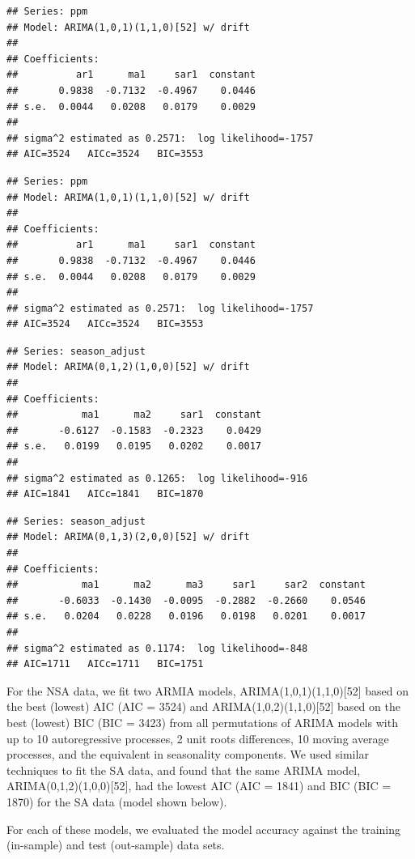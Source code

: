 \documentclass[AER]{AEA}
\begin{document}
\begin{verbatim}
## Series: ppm 
## Model: ARIMA(1,0,1)(1,1,0)[52] w/ drift 
## 
## Coefficients:
##          ar1      ma1     sar1  constant
##       0.9838  -0.7132  -0.4967    0.0446
## s.e.  0.0044   0.0208   0.0179    0.0029
## 
## sigma^2 estimated as 0.2571:  log likelihood=-1757
## AIC=3524   AICc=3524   BIC=3553
\end{verbatim}

\begin{verbatim}
## Series: ppm 
## Model: ARIMA(1,0,1)(1,1,0)[52] w/ drift 
## 
## Coefficients:
##          ar1      ma1     sar1  constant
##       0.9838  -0.7132  -0.4967    0.0446
## s.e.  0.0044   0.0208   0.0179    0.0029
## 
## sigma^2 estimated as 0.2571:  log likelihood=-1757
## AIC=3524   AICc=3524   BIC=3553
\end{verbatim}

\begin{verbatim}
## Series: season_adjust 
## Model: ARIMA(0,1,2)(1,0,0)[52] w/ drift 
## 
## Coefficients:
##           ma1      ma2     sar1  constant
##       -0.6127  -0.1583  -0.2323    0.0429
## s.e.   0.0199   0.0195   0.0202    0.0017
## 
## sigma^2 estimated as 0.1265:  log likelihood=-916
## AIC=1841   AICc=1841   BIC=1870
\end{verbatim}

\begin{verbatim}
## Series: season_adjust 
## Model: ARIMA(0,1,3)(2,0,0)[52] w/ drift 
## 
## Coefficients:
##           ma1      ma2      ma3     sar1     sar2  constant
##       -0.6033  -0.1430  -0.0095  -0.2882  -0.2660    0.0546
## s.e.   0.0204   0.0228   0.0196   0.0198   0.0201    0.0017
## 
## sigma^2 estimated as 0.1174:  log likelihood=-848
## AIC=1711   AICc=1711   BIC=1751
\end{verbatim}

For the NSA data, we fit two ARMIA models, ARIMA(1,0,1)(1,1,0){[}52{]}
based on the best (lowest) AIC (AIC = 3524) and
ARIMA(1,0,2)(1,1,0){[}52{]} based on the best (lowest) BIC (BIC = 3423)
from all permutations of ARIMA models with up to 10 autoregressive
processes, 2 unit roots differences, 10 moving average processes, and
the equivalent in seasonality components. We used similar techniques to
fit the SA data, and found that the same ARIMA model,
ARIMA(0,1,2)(1,0,0){[}52{]}, had the lowest AIC (AIC = 1841) and BIC
(BIC = 1870) for the SA data (model shown below).

For each of these models, we evaluated the model accuracy against the
training (in-sample) and test (out-sample) data sets.
\end{document}
